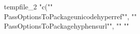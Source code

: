 tempfile_2
"c(""\\PassOptionsToPackage{unicode}{hyperref}"", ""\\PassOptionsToPackage{hyphens}{url}"", ""%
""%

